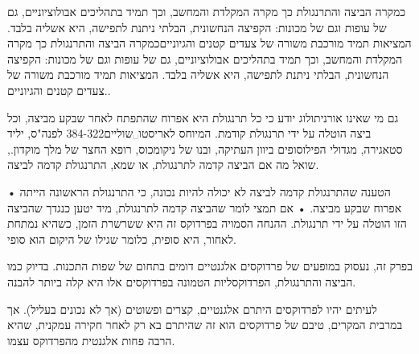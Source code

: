 ﻿כמקרה הביצה והתרנגולת כך מקרה המקלדת והמחשב, וכך תמיד בתהליכים אבולוציוניים, גם
של עופות וגם של מכונות: הקפיצה הנחשונית, הבלתי ניתנת לתפישה, היא אשליה בלבד.
המציאות תמיד מורכבת משורה של צעדים קטנים והגיונייםכמקרה הביצה והתרנגולת כך מקרה
המקלדת והמחשב, וכך תמיד בתהליכים אבולוציוניים, גם של עופות וגם של מכונות:
הקפיצה הנחשונית, הבלתי ניתנת לתפישה, היא אשליה בלבד. המציאות תמיד מורכבת משורה
של צעדים קטנים והגיוניים.. 

גם מי שאינו אורניתולוג יודע כי כל תרנגולת היא אפרוח שהתפתח לאחר שבקע מביצה, וכל
ביצה הוטלה על ידי תרנגולת קודמת.  המיוחס לאריסטו␣שוליים{384-322 לפנה"ס, יליד סטאגירה, מגדולי
הפילוסופים ביוון העתיקה, ובנו של ניקומכוס, רופא החצר של מלך מוקדון.}, שואל מה
אם הביצה קדמה לתרנגולת, או שמא, התרנגולת קדמה לביצה.
\begin{itemize}
• הטענה שהתרנגולת קדמה לביצה לא יכולה להיות נכונה, כי התרנגולת הראשונה הייתה אפרוח שבקע מביצה.
• אם תמצי לומר שהביצה קדמה לתרנגולת, מיד יטען כנגדך שהביצה הזו הוטלה על ידי תרנגולת.
ההנחה הסמויה בפרדוקס זה היא ששרשרת הזמן, כשהיא נמתחת לאחור, היא סופית, כלומר שגילו של היקום הוא סופי.
\end{itemize}
בפרק זה, נעסוק במופעים של פרדוקסים אלגנטיים דומים בתחום של שפות התכנות. בדיוק כמו הביצה והתרנגולת, הפרדוקסליות הטמונה בפרדוקסים אלו היא קלה ביותר להבנה.

לעיתים יהיו לפרדוקסים היתרם אלגנטיים, קצרים ופשוטים (אך לא נכונים בעליל). אך במרבית המקרים, טיבם של פרדוקסים הוא זה שהיתרם בא רק לאחר חקירה עמקנית, שהיא הרבה פחות אלגנטית מהפרדוקס עצמו.

